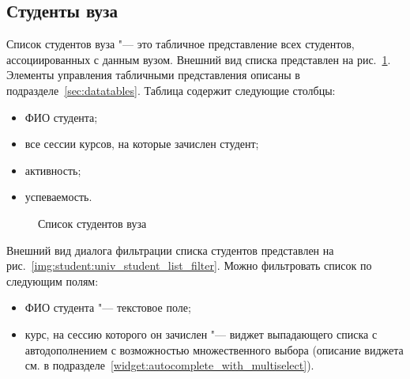 \subsection{Студенты вуза}

Список студентов вуза "--- это табличное представление всех студентов, ассоциированных с данным вузом.
Внешний вид списка представлен на рис.~\ref{img:student:univ_student_list}. 
Элементы управления табличными представления описаны в подразделе~\ref{sec:datatables}.
Таблица содержит следующие столбцы:
\begin{itemize}
	\item ФИО студента;
	\item все сессии курсов, на которые зачислен студент;
	\item активность;
	\item успеваемость.
\end{itemize}

\begin{figure}[H]
	\caption{Список студентов вуза}
	\label{img:student:univ_student_list}
\end{figure}

Внешний вид диалога фильтрации списка студентов представлен на рис.~\ref{img:student:univ_student_list_filter}.
Можно фильтровать список по следующим полям:
\begin{itemize}
	\item ФИО студента "--- текстовое поле;
	\item курс, на сессию которого он зачислен "--- виджет выпадающего списка с автодополнением 
	с возможностью множественного выбора (описание виджета см. в подразделе~\ref{widget:autocomplete_with_multiselect}).
\end{itemize}

